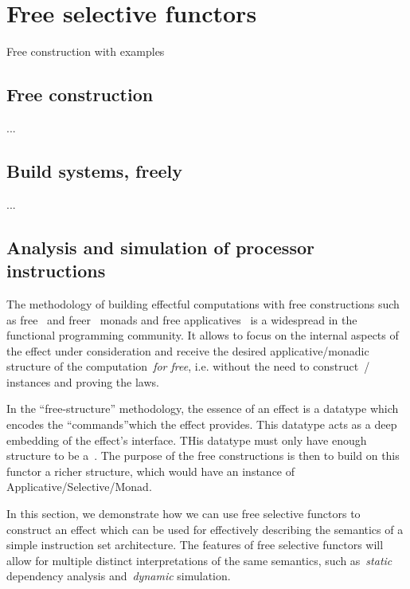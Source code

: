 \section{Free selective functors}\label{sec-free}

Free construction with examples

\subsection{Free construction}\label{sec-free-construction}

...

\subsection{Build systems, freely}

...

\subsection{Analysis and simulation of processor instructions}

The methodology of building effectful computations with free constructions such
as free~\cite{free-monads} and freer~\cite{freer-monads} monads and free
applicatives~\cite{free-applicatives} is a widespread in the functional programming community.
It allows to focus on the internal aspects of the effect under consideration and receive the
desired applicative/monadic structure of the computation~\emph{for free}, i.e. without the need
to construct~/~ instances and proving the laws.

In the ``free-structure'' methodology, the essence of an effect is a datatype which encodes
the ``commands''which the effect provides. This datatype acts as a deep embedding of the effect's
interface. THis datatype must only have enough structure to be a~. The purpose of
the free constructions is then to build on this functor a richer structure, which would have
an instance of Applicative/Selective/Monad.

In this section, we demonstrate how we can use free selective functors to construct an
effect which can be used for effectively describing the semantics of a simple instruction set
architecture. The features of free selective functors will allow for multiple distinct
interpretations of the same semantics, such as~\emph{static} dependency analysis
and~\emph{dynamic} simulation.


